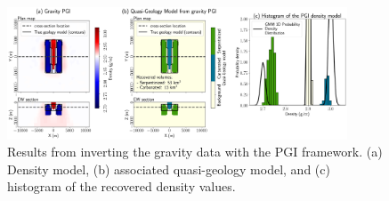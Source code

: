 \begin{figure}[!htb]
    \begin{center}
    \includegraphics[width=0.9\textwidth]{figures/Single-Physics-PGI-Gravity.png}
    \end{center}
\caption{
    Results from inverting the gravity data with the PGI framework. (a) Density model, (b) associated quasi-geology model, and (c) histogram of the recovered density values.
}
\label{fig:single-physics-pgi-gravity}
\end{figure}
